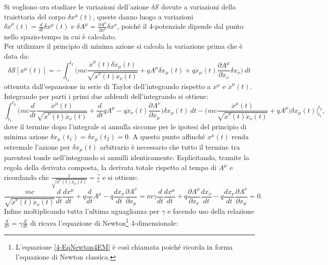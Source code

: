 Si vogliono ora studiare le variazioni dell'azione $\delta \mathcal{S}$ dovute a variazioni della traiettoria del corpo $\delta x^\mu(t)$, queste danno luogo a variazioni $\delta \dot x^\mu(t)=\frac{d}{dt}\delta x^\mu(t)$ e $\delta A^\mu=\frac{\partial A^\mu}{\partial x^\nu}\delta x^\nu$, poiché il 4-potenziale dipende dal punto nello spazio-tempo in cui è calcolato.\\ Per utilizzare il principio di minima azione si calcola la variazione prima che è  data da:
\begin{equation*}
    \delta \mathcal{S} [x^\mu(t)]=-\int_{t_1}^{t_2}\bigg(mc\frac{\dot x^\mu(t)\delta\dot x_\mu(t)}{\sqrt{\dot x^\nu(t)\dot x_\nu(t)}}+qA^\mu\delta \dot x_\mu(t)+q\dot x_\mu(t)\frac{\partial A^\mu}{\partial x_\nu}\delta x_\nu\bigg)\ dt
\end{equation*} 
ottenuta dall'espansione in serie di Taylor dell'integrando rispetto a $x^\mu$ e $\dot x^\mu(t)$.\\
Integrando per parti i primi due addendi dell'integrando si ottiene:
\begin{equation*}
    \int_{t_1}^{t_2}\bigg(mc\frac{d}{dt}\frac{\dot x^\mu(t)}{\sqrt{\dot x^\nu(t)\dot x_\nu(t)}}+\frac{d}{dt}qA^\mu-q\dot x_\nu(t)\frac{\partial A^\nu}{\partial x_\mu}\bigg)\delta x_\mu(t)\ dt-\bigg(mc\frac{\dot x^\mu(t)}{\sqrt{\dot x^\nu(t)\dot x_\nu(t)}}+qA^\mu\bigg)\delta x_\mu(t)\bigg|_{t_1}^{t_2},
\end{equation*} 
dove il termine dopo l'integrale si annulla siccome per le ipotesi del principio di minima azione $\delta x_\mu(t_1)=\delta x_\mu(t_2)=0$. A questo punto affinché $x^\mu(t)$ renda estremale l'azione per $\delta x_\mu(t)$ arbitrario è necessario che tutto il termine tra parentesi tonde nell'integrando si annulli identicamente. Esplicitando, tramite la regola della derivata composta, la derivata totale rispetto al tempo di $A^\mu$ e ricordando che $\frac{1}{\sqrt{\dot x^\nu(t)\dot x_\nu(t)}}=\frac{\gamma}{c}$ e si ottiene:
\begin{equation*}
    \frac{mc}{\sqrt{\dot x^\nu(t)\dot x_\nu(t)}}\frac{d}{dt}\frac{dx^\mu}{dt}+q\frac{d}{dt}A^\mu-q\frac{dx_\nu}{dt} \frac{\partial A^\nu}{\partial x_\mu}=m\gamma\frac{d}{dt}\frac{dx^\mu}{dt}+q\frac{\partial A^\mu}{\partial x_\nu}\frac{dx_\nu}{dt}-q\frac{dx_\nu}{dt} \frac{\partial A^\nu}{\partial x_\mu}=0.
\end{equation*}
Infine moltiplicando tutta l'ultima uguaglianza per $\gamma$ e facendo uso della relazione $\frac{d}{d\tau}=\gamma\frac{d}{dt}$ di ricava l'equazione di Newton\footnote{L'equazione \eqref{4-EqNewton4EM} è così chiamata poiché ricorda in forma l'equazione di Newton classica.} 4-dimensionale:
